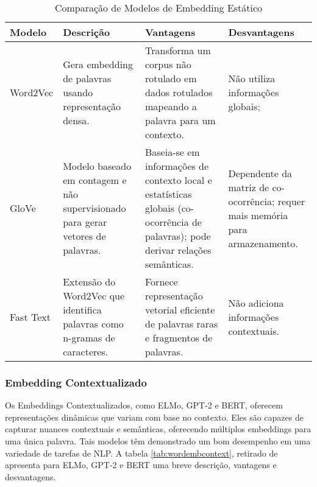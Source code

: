 \begin{table}[h]
\centering
\scriptsize
\begin{tabular}{l|p{3cm}|p{3cm}|p{3cm}}
\hline
\textbf{Modelo} & \textbf{Descrição} & \textbf{Vantagens} & \textbf{Desvantagens} \\
\hline
Word2Vec & Gera embedding de palavras usando representação densa. & Transforma um corpus não rotulado em dados rotulados mapeando a palavra para um contexto. & Não utiliza informações globais; \\
\hline
GloVe & Modelo baseado em contagem e não supervisionado para gerar vetores de palavras. & Baseia-se em informações de contexto local e estatísticas globais (co-ocorrência de palavras); pode derivar relações semânticas. & Dependente da matriz de co-ocorrência; requer mais memória para armazenamento. \\
\hline
Fast Text & Extensão do Word2Vec que identifica palavras como n-gramas de caracteres. & Fornece representação vetorial eficiente de palavras raras e fragmentos de palavras. & Não adiciona informações contextuais. \\
\hline
\end{tabular}
\caption{Comparação de Modelos de Embedding Estático}
\label{tab:wordembstatic}
\end{table}

\subsubsection{Embedding Contextualizado}

Os Embeddings Contextualizados, como ELMo, GPT-2 e BERT, oferecem representações dinâmicas que variam com base no contexto. Eles são capazes de capturar nuances contextuais e semânticas, oferecendo múltiplos embeddings para uma única palavra. Tais modelos têm demonstrado um bom desempenho em uma variedade de tarefas de NLP.  A tabela \ref{tab:wordembcontext}, retirado de \cite{selva2021review} apresenta para ELMo, GPT-2 e BERT uma breve descrição, vantagens e desvantagens.

